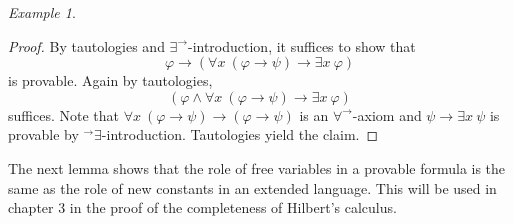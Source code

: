 \documentclass[a4paper, 11pt]{amsart}
\theoremstyle{remark}
\newtheorem{example}[example]{Example}
\newenvironment{enumerate-(1)}{\begin{enumerate}[label={\upshape (\arabic*)}, leftmargin=2pc]}{\end{enumerate}}
\begin{document}
\begin{example}
\begin{enumerate-(1)}
\begin{proof} 
By tautologies and $\exists^\rightarrow$-introduction, it suffices to show that 
$$ \varphi \rightarrow ( \forall x\ (\varphi \rightarrow \psi)  \rightarrow \exists x\ \varphi )   $$ 
is provable. 
Again by tautologies, 
$$ ( \varphi \wedge  \forall x\ (\varphi \rightarrow \psi)  \rightarrow \exists x\ \varphi )   $$ 
suffices. 
Note that $\forall x\ (\varphi\rightarrow \psi)  \rightarrow  (\varphi \rightarrow \psi) $ is an $\forall^\rightarrow$-axiom and 
$\psi\rightarrow \exists x\ \psi$ is provable by ${}^\rightarrow\exists$-introduction. 
Tautologies yield the claim. 
\end{proof} 
\end{enumerate-(1)} 
\end{example} 





The next lemma shows that  the role of free variables in a provable formula is the same as the role of new constants in an extended language. 
This will be used in chapter 3 in the proof of the completeness of Hilbert's calculus. 
\end{document}
